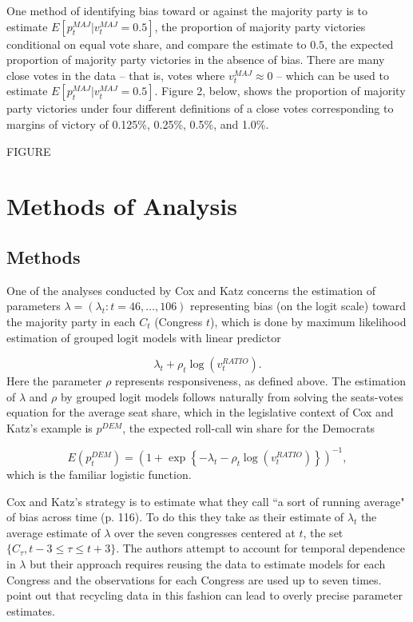 One method of identifying bias toward or against the majority party is to estimate $E[p_t^{MAJ} |v_t^{MAJ}=0.5]$, the proportion of majority party victories conditional on equal vote share, and compare the estimate to $0.5$, the expected proportion of majority party victories in the absence of bias.  There are many close votes in the data -- that is, votes where $v_t^{MAJ} \approx 0$ -- which can be used to estimate $E[p_t^{MAJ} |v_t^{MAJ}=0.5]$.  Figure 2, below, shows the proportion of majority party victories under four different definitions of a close votes corresponding to margins of victory of 0.125\%, 0.25\%, 0.5\%, and 1.0\%. 

\vskip1cm
FIGURE
\vskip1cm

\section{Methods of Analysis}
\subsection{Methods}

One of the analyses conducted by Cox and Katz concerns the estimation of parameters  $\lambda = (\lambda_t : t = 46, \dots, 106)$ representing bias (on the logit scale) toward the majority party in each $C_t$ (Congress $t$), which is done by maximum likelihood estimation of grouped logit models with linear predictor

{\singlespacing
$$ \lambda_t + \rho_t \log{\left(v_t^{RATIO} \right)}. $$
}
%
Here the parameter $\rho$ represents responsiveness, as defined above. The estimation of $\lambda$ and $\rho$ by grouped logit models follows naturally from solving the seats-votes equation for the average seat share, which in the legislative context of Cox and Katz's example is $p^{DEM}$, the expected roll-call win share for the Democrats 

{\singlespacing
$$  
  E(p^{DEM}_t)  = \left(1 + \exp{\left\{- \lambda_t - \rho_t \log{\left( v_t^{RATIO}  \right)}\right\}}\right)^{-1},
$$
}
%
\noindent which is the familiar logistic function. 

Cox and Katz's strategy is to estimate what they call ``a sort of running average" of bias across time (p. 116). To do this they take as their estimate of $\lambda_t$ the average estimate of $\lambda$ over the seven congresses centered at $t$, the set $\{C_\tau, t-3 \leq \tau \leq t+3\}$. The authors attempt to account for temporal dependence in $\lambda$ but their approach requires reusing the data to estimate models for each Congress and the observations for each Congress are used up to seven times.   point out that recycling data in this fashion can lead to overly precise parameter estimates. 

